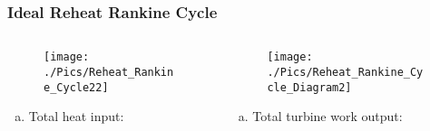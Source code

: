 \documentclass[10pt,compress,handout,unknownkeysallowed]{beamer}
\begin{document}
\begin{frame}
 \frametitle{Ideal Reheat Rankine Cycle}
  \begin{columns}
     \begin{column}[c]{0.5\linewidth} 
       \begin{center}
          \begin{figure}
             \texttt{[image: ./Pics/Reheat\_Rankine\_Cycle22]}
          \end{figure}
       \end{center}
       \begin{enumerate}[(a)] \scriptsize\setcounter{enumi}{6}
          \item<1-> Total heat input: 
       \end{enumerate}
     \end{column}
     \begin{column}[c]{0.5\linewidth}
       \begin{center}
          \begin{figure}
             \texttt{[image: ./Pics/Reheat\_Rankine\_Cycle\_Diagram2]}
          \end{figure}
       \end{center}
       \begin{enumerate}[(a)] \scriptsize\setcounter{enumi}{7}
          \item<2-> Total turbine work output:
       \end{enumerate}
     \end{column}
  \end{columns}
 \normalsize
\end{frame}
\end{document}
